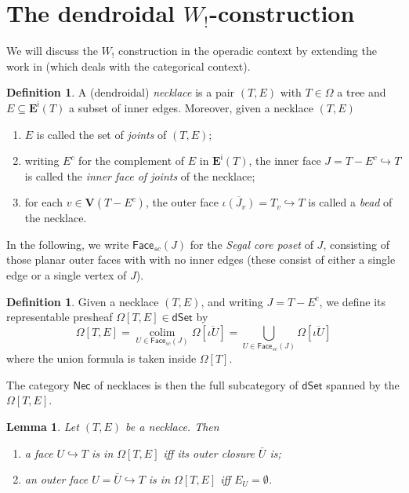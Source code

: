 \documentclass[a4paper,10pt
,draft
]{article}%
\numberwithin{equation}{section}
\numberwithin{figure}{section}
\newtheorem{lemma}[equation]{Lemma}%
\theoremstyle{definition} %
\newtheorem{definition}[equation]{Definition}%
\DeclareMathOperator{\colim}{colim}%
\newcommand{\1}{\ensuremath{\mathbbm 1}}%
\begin{document}
\section{The dendroidal $W_!$-construction}


We will discuss the $W_!$
construction in the operadic context by extending the 
work in \cite{DS11}
(which deals with the categorical context).


\begin{definition}
A (dendroidal) \emph{necklace} is a pair $(T,E)$
with $T \in \Omega$
a tree and
$E \subseteq \boldsymbol{E}^{\mathsf{i}}(T)$
a subset of inner edges.
%
Moreover, given a necklace $(T,E)$
\begin{enumerate}[label = (\roman*)]
\item $E$ is called the set of \emph{joints} of $(T,E)$;
\item writing $E^c$ for the complement of $E$ in 
$\boldsymbol{E}^{\mathsf{i}}(T)$,
the inner face $J=T-E^c \hookrightarrow T$
is called the \emph{inner face of joints} of the necklace;
\item for each $v \in \boldsymbol{V}(T-E^c)$,
the outer face
$\overline{\iota(J_v)} = T_v \hookrightarrow T$
is called a \emph{bead} of the necklace.
\end{enumerate}
\end{definition}

In the following, we write 
$\mathsf{Face}_{sc}(J)$ for the \emph{Segal core poset} of $J$,
consisting of those planar outer faces with with no inner edges
(these consist of either a single edge or a single vertex of $J$).

\begin{definition}
	Given a necklace 
	$(T,E)$, 
	and writing $J = T-E^c$,
	we define its representable presheaf
	$\Omega[T,E] \in \mathsf{dSet}$ by
\begin{equation}
	\Omega[T,E] 
= 
	\underset{U \in \mathsf{Face}_{sc}(J)}{\colim}
	\Omega[\overline{\iota U}]
=
	\bigcup_{U \in \mathsf{Face}_{sc}(J)} 
	\Omega[\overline{\iota U}]
\end{equation}
	where the union formula is taken inside $\Omega[T]$.
	
	The category $\mathsf{Nec}$ of necklaces is then the full subcategory of $\mathsf{dSet}$
	spanned by the $\Omega[T,E]$.
\end{definition}



\begin{lemma}\label{FACEINNECK LEM}
	Let $(T,E)$ be a necklace. Then
\begin{enumerate}[label=(\roman*)]
	\item a face $U \hookrightarrow T$
	is in $\Omega[T,E]$
	iff its outer closure $\bar{U}$ is; 
	\item an outer face 
	$U = \bar{U} \hookrightarrow T$
	is in $\Omega[T,E]$ iff $E_U = \emptyset$.
\end{enumerate}
\end{lemma}
\end{document}
